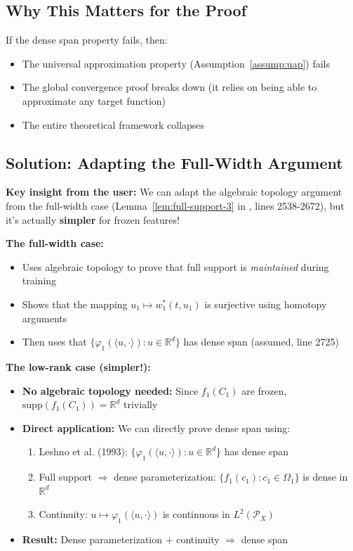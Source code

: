 \subsection{Why This Matters for the Proof}

If the dense span property fails, then:
\begin{itemize}
\item The universal approximation property (Assumption~\ref{assump:uap}) fails
\item The global convergence proof breaks down (it relies on being able to approximate any target function)
\item The entire theoretical framework collapses
\end{itemize}

\subsection{Solution: Adapting the Full-Width Argument}

\textbf{Key insight from the user:} We can adapt the algebraic topology argument from the full-width case (Lemma~\ref{lem:full-support-3} in \cite{nguyen2023rigorousframeworkmeanfield}, lines 2538-2672), but it's actually \textbf{simpler} for frozen features!

\textbf{The full-width case:}
\begin{itemize}
\item Uses algebraic topology to prove that full support is \emph{maintained} during training
\item Shows that the mapping $u_1 \mapsto w_1^*(t, u_1)$ is surjective using homotopy arguments
\item Then uses that $\{\varphi_1(\langle u, \cdot\rangle) : u \in \mathbb{R}^d\}$ has dense span (assumed, line 2725)
\end{itemize}

\textbf{The low-rank case (simpler!):}
\begin{itemize}
\item \textbf{No algebraic topology needed:} Since $f_1(C_1)$ are frozen, $\text{supp}(f_1(C_1)) = \mathbb{R}^d$ trivially
\item \textbf{Direct application:} We can directly prove dense span using:
\begin{enumerate}
\item Leshno et al. (1993): $\{\varphi_1(\langle u, \cdot\rangle) : u \in \mathbb{R}^d\}$ has dense span
\item Full support $\Rightarrow$ dense parameterization: $\{f_1(c_1) : c_1 \in \Omega_1\}$ is dense in $\mathbb{R}^d$
\item Continuity: $u \mapsto \varphi_1(\langle u, \cdot\rangle)$ is continuous in $L^2(\mathcal{P}_X)$
\end{enumerate}
\item \textbf{Result:} Dense parameterization + continuity $\Rightarrow$ dense span
\end{itemize}

